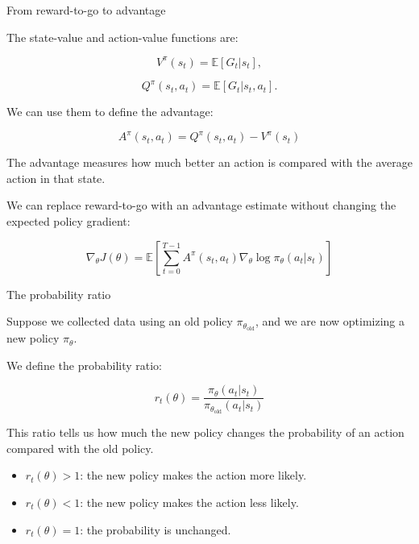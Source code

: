 \documentclass{beamer}
\begin{document}
\begin{frame}{From reward-to-go to advantage}
	\begin{flushleft}
		
		The state-value and action-value functions are:
		
		\[
		V^\pi(s_t)=\mathbb{E}[G_t|s_t],
		\]
		
		\[
		Q^\pi(s_t,a_t)=\mathbb{E}[G_t|s_t,a_t].
		\]
		
		We can use them to define the advantage:
		
		\[
		\boxed{
			A^\pi(s_t,a_t)
			=
			Q^\pi(s_t,a_t)-V^\pi(s_t)
		}
		\]
		
		The advantage measures how much better an action
		is compared with the average action in that state.
		
		We can replace reward-to-go with an advantage estimate
		without changing the expected policy gradient:
		
		\[
		\boxed{
			\nabla_\theta J(\theta)
			=
			\mathbb{E}
			\left[
			\sum_{t=0}^{T-1}
			A^\pi(s_t,a_t)
			\nabla_\theta\log\pi_\theta(a_t|s_t)
			\right]
		}
		\]
		
	\end{flushleft}
\end{frame}


\begin{frame}{The probability ratio}
	\begin{flushleft}
		
		Suppose we collected data using an old policy
		$\pi_{\theta_{\mathrm{old}}}$, and we are now optimizing
		a new policy $\pi_\theta$.
		
		We define the probability ratio:
		
		\[
		\boxed{
			r_t(\theta)
			=
			\frac{
				\pi_\theta(a_t|s_t)
			}{
				\pi_{\theta_{\mathrm{old}}}(a_t|s_t)
			}
		}
		\]
		
		This ratio tells us how much the new policy changes
		the probability of an action compared with the old policy.
		
		\begin{itemize}
			\item $r_t(\theta)>1$: the new policy makes the action
			more likely.
			\item $r_t(\theta)<1$: the new policy makes the action
			less likely.
			\item $r_t(\theta)=1$: the probability is unchanged.
		\end{itemize}
		
	\end{flushleft}
\end{frame}
\end{document}
